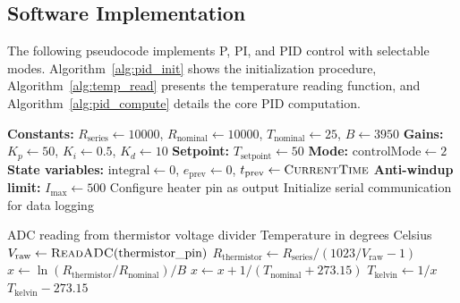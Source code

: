 \subsection{Software Implementation}

The following pseudocode implements P, PI, and PID control with selectable modes. Algorithm~\ref{alg:pid_init} shows the initialization procedure, Algorithm~\ref{alg:temp_read} presents the temperature reading function, and Algorithm~\ref{alg:pid_compute} details the core PID computation.

\begin{algorithm}[htbp]
\caption{PID Controller Initialization}
\label{alg:pid_init}
\begin{algorithmic}[1]
\State \textbf{Constants:} $R_{\text{series}} \gets 10000$, $R_{\text{nominal}} \gets 10000$, $T_{\text{nominal}} \gets 25$, $B \gets 3950$
\State \textbf{Gains:} $K_p \gets 50$, $K_i \gets 0.5$, $K_d \gets 10$
\State \textbf{Setpoint:} $T_{\text{setpoint}} \gets 50$ 
\State \textbf{Mode:} $\text{controlMode} \gets 2$ 
\State \textbf{State variables:} $\text{integral} \gets 0$, $e_{\text{prev}} \gets 0$, $t_{\text{prev}} \gets \Call{CurrentTime}{}$
\State \textbf{Anti-windup limit:} $I_{\text{max}} \gets 500$
\State Configure heater pin as output
\State Initialize serial communication for data logging
\end{algorithmic}
\end{algorithm}

\begin{algorithm}[htbp]
\caption{Temperature Reading from Thermistor}
\label{alg:temp_read}
\begin{algorithmic}[1]
\Require ADC reading from thermistor voltage divider
\Ensure Temperature in degrees Celsius
\State $V_{\text{raw}} \gets \Call{ReadADC}{\text{thermistor\_pin}}$
\State $R_{\text{thermistor}} \gets R_{\text{series}} / (1023 / V_{\text{raw}} - 1)$ 
\State $x \gets \ln(R_{\text{thermistor}} / R_{\text{nominal}}) / B$ 
\State $x \gets x + 1 / (T_{\text{nominal}} + 273.15)$
\State $T_{\text{kelvin}} \gets 1 / x$
\State \Return $T_{\text{kelvin}} - 273.15$ 
\end{algorithmic}
\end{algorithm}

